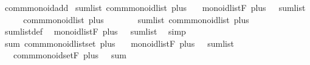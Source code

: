 \begin{isabellebody}
%
\endisatagproof
{\isafoldproof}%
%
\isadelimproof
%
\endisadelimproof
\isanewline
\isanewline
{}\isamarkupfalse%
\isanewline
\isanewline
{}\isamarkupfalse%
\ comm{\isacharunderscore}{\kern0pt}monoid{\isacharunderscore}{\kern0pt}add\isanewline
{}\isanewline
\isanewline
{}\isamarkupfalse%
\ sum{\isacharunderscore}{\kern0pt}list{\isacharcolon}{\kern0pt}\ comm{\isacharunderscore}{\kern0pt}monoid{\isacharunderscore}{\kern0pt}list\ plus\ {}\isanewline
{}\isanewline
\ \ {\isachardoublequoteopen}monoid{\isacharunderscore}{\kern0pt}list{\isachardot}{\kern0pt}F\ plus\ {}\ {\isacharequal}{\kern0pt}\ sum{\isacharunderscore}{\kern0pt}list{\isachardoublequoteclose}\isanewline
%
\isadelimproof
%
\endisadelimproof
%
\isatagproof
{}\isamarkupfalse%
\ {\isacharminus}{\kern0pt}\isanewline
\ \ \isamarkupfalse%
\ {\isachardoublequoteopen}comm{\isacharunderscore}{\kern0pt}monoid{\isacharunderscore}{\kern0pt}list\ plus\ {}{\isachardoublequoteclose}\ \isacommand{{\isachardot}{\kern0pt}{\isachardot}{\kern0pt}}\isamarkupfalse%
\isanewline
\ \ \isamarkupfalse%
\ \isamarkupfalse%
\ sum{\isacharunderscore}{\kern0pt}list{\isacharcolon}{\kern0pt}\ comm{\isacharunderscore}{\kern0pt}monoid{\isacharunderscore}{\kern0pt}list\ plus\ {}\ \isacommand{{\isachardot}{\kern0pt}}\isamarkupfalse%
\isanewline
\ \ \isamarkupfalse%
\ sum{\isacharunderscore}{\kern0pt}list{\isacharunderscore}{\kern0pt}def\ \isamarkupfalse%
\ {\isachardoublequoteopen}monoid{\isacharunderscore}{\kern0pt}list{\isachardot}{\kern0pt}F\ plus\ {}\ {\isacharequal}{\kern0pt}\ sum{\isacharunderscore}{\kern0pt}list{\isachardoublequoteclose}\ \isamarkupfalse%
\ simp\isanewline
{}\isamarkupfalse%
%
\endisatagproof
{\isafoldproof}%
%
\isadelimproof
\isanewline
%
\endisadelimproof
\isanewline
{}\isamarkupfalse%
\ sum{\isacharcolon}{\kern0pt}\ comm{\isacharunderscore}{\kern0pt}monoid{\isacharunderscore}{\kern0pt}list{\isacharunderscore}{\kern0pt}set\ plus\ {}\isanewline
{}\isanewline
\ \ {\isachardoublequoteopen}monoid{\isacharunderscore}{\kern0pt}list{\isachardot}{\kern0pt}F\ plus\ {}\ {\isacharequal}{\kern0pt}\ sum{\isacharunderscore}{\kern0pt}list{\isachardoublequoteclose}\isanewline
\ \ \ {\isachardoublequoteopen}comm{\isacharunderscore}{\kern0pt}monoid{\isacharunderscore}{\kern0pt}set{\isachardot}{\kern0pt}F\ plus\ {}\ {\isacharequal}{\kern0pt}\ sum{\isachardoublequoteclose}\isanewline

\end{isabellebody}
